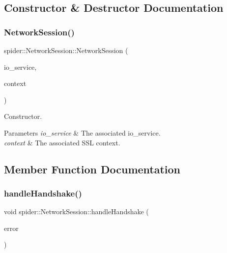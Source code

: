 \subsection{Constructor \& Destructor Documentation}
\mbox{\label{classspider_1_1_network_session_a1049001c94e30b57a9986a1ec26d1b0c}} 
\subsubsection{Network\+Session()}
{\footnotesize\ttfamily spider\+::\+Network\+Session\+::\+Network\+Session (\begin{DoxyParamCaption}\item[{boost\+::asio\+::io\+\_\+service \&}]{io\+\_\+service,  }\item[{boost\+::asio\+::ssl\+::context \&}]{context }\end{DoxyParamCaption})}



Constructor. 


\begin{DoxyParams}{Parameters}
{\em io\+\_\+service} & The associated io\+\_\+service. \\
\hline
{\em context} & The associated S\+SL context. \\
\hline
\end{DoxyParams}


\subsection{Member Function Documentation}
\mbox{\label{classspider_1_1_network_session_afeb40632e9a388efbb4bb575f8eec76a}} 
\subsubsection{handle\+Handshake()}
{\footnotesize\ttfamily void spider\+::\+Network\+Session\+::handle\+Handshake (\begin{DoxyParamCaption}\item[{boost\+::system\+::error\+\_\+code const \&}]{error }\end{DoxyParamCaption})}



